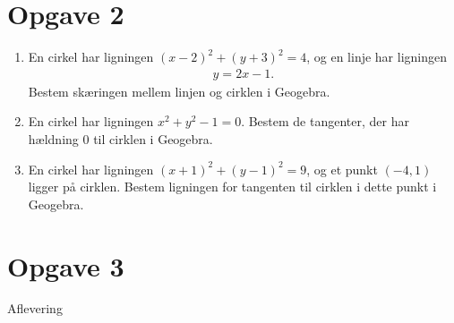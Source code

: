 \section*{Opgave 2}
\begin{enumerate}[label=\roman*)]
\item En cirkel har ligningen $(x-2)^2+(y+3)^2 = 4$, og en linje har ligningen 
\begin{align*}
y=2x-1.
\end{align*}
Bestem skæringen mellem linjen og cirklen i Geogebra. 
\item En cirkel har ligningen $x^2+y^2-1=0$. Bestem de tangenter, der har hældning $0$ til cirklen i Geogebra. 
\item En cirkel har ligningen $(x+1)^2 +(y-1)^2 = 9$, og et punkt $(-4,1)$ ligger på cirklen. Bestem ligningen for tangenten til cirklen i dette punkt i Geogebra. 
\end{enumerate}
\section*{Opgave 3}
Aflevering